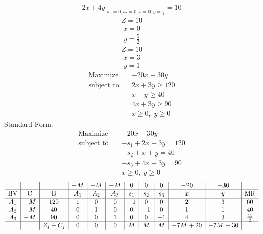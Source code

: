 \documentclass{article}
\begin{document}
\begin{align*}
\left.2x + 4y\right|_{s_{1}=0,s_{2}=0,x=0,y=\frac{5}{2}}=10\end{align*}
\begin{align*}
Z=10\end{align*}
\begin{align*}
x=0\end{align*}
\begin{align*}
y=\frac{5}{2}\end{align*}
\begin{align*}
Z=10\end{align*}
\begin{align*}
x=3\end{align*}
\begin{align*}
y=1\end{align*}
\begin{align*}
\text{Maximize} \quad & -20x - 30y\\
\text{subject to} \quad
& 2x + 3y\ge120\\
& x + y\ge40\\
& 4x + 3y\ge90\\
& x\ge0,\; y\ge0\end{align*}
Standard Form:\\
\begin{align*}
\text{Maximize} \quad & -20x - 30y\\
\text{subject to} \quad
& -s_{1} + 2x + 3y=120\\
& -s_{2} + x + y=40\\
& -s_{3} + 4x + 3y=90\\
& x\ge0,\; y\ge0\end{align*}
\begin{align*}
\begin{array}{c|c|c|c|c|c|c|c|c|c|c|c}
 &  &  & -M & -M & -M & 0 & 0 & 0 & -20 & -30 & \\
\hline
\text{BV} & \text{C} & \text{B} & A_{1} & A_{2} & A_{3} & s_{1} & s_{2} & s_{3} & x & y & \text{MR} \\
\hline
A_{1} & -M & 120 & 1 & 0 & 0 & -1 & 0 & 0 & 2 & 3 & 60 \\
A_{2} & -M & 40 & 0 & 1 & 0 & 0 & -1 & 0 & 1 & 1 & 40 \\
A_{3} & -M & 90 & 0 & 0 & 1 & 0 & 0 & -1 & 4 & 3 & \frac{45}{2} \\
\hline
 &  & Z_j-C_j & 0 & 0 & 0 & M & M & M & -7M + 20 & -7M + 30 & \\
\end{array}
\end{align*}
\end{document}
